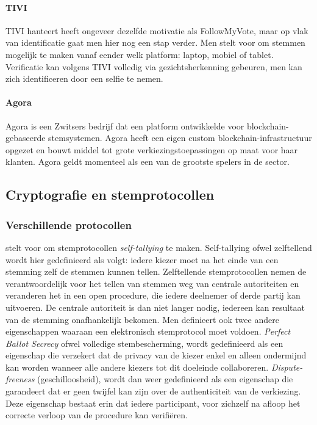				\paragraph{TIVI}
					TIVI hanteert heeft ongeveer dezelfde motivatie als FollowMyVote, maar op vlak van identificatie gaat men hier nog een stap verder. Men stelt voor om stemmen mogelijk te maken vanaf eender welk platform: laptop, mobiel of tablet. Verificatie kan volgens TIVI volledig via gezichtsherkenning gebeuren, men kan zich  identificeren door een selfie te nemen. ~\autocite{Kshetri2018}
				\paragraph{Agora}
					Agora is een Zwitsers bedrijf dat een platform ontwikkelde voor blockchain-gebaseerde stemsystemen. Agora heeft een eigen custom blockchain-infrastructuur opgezet en bouwt middel tot grote verkiezingstoepassingen op maat voor haar klanten. Agora geldt momenteel als een van de grootste spelers in de sector. ~\autocite{Kshetri2018}
					
	\subsection{Cryptografie en stemprotocollen}
		\subsubsection{Verschillende protocollen}
		\textcite{Kiayias2002} stelt voor om stemprotocollen \textit{self-tallying} te maken. Self-tallying ofwel zelftellend wordt hier gedefinieerd als volgt: iedere kiezer moet na het einde van een stemming zelf de stemmen kunnen tellen. Zelftellende stemprotocollen nemen de verantwoordelijk voor het tellen van stemmen weg van centrale autoriteiten en veranderen het in een open procedure, die iedere deelnemer of derde partij kan uitvoeren. De centrale autoriteit is dan niet langer nodig, iedereen kan resultaat van de stemming onafhankelijk bekomen. Men definieert ook twee andere eigenschappen waaraan een elektronisch stemprotocol moet voldoen.  \textit{Perfect Ballot Secrecy} ofwel volledige stembescherming, wordt gedefinieerd als een eigenschap die verzekert dat de privacy van de kiezer enkel en alleen ondermijnd kan worden wanneer alle andere kiezers tot dit doeleinde collaboreren. \textit{Dispute-freeness} (geschilloosheid), wordt dan weer gedefinieerd als een eigenschap die garandeert dat er geen twijfel kan zijn over de authenticiteit van de verkiezing. Deze eigenschap bestaat erin dat iedere participant,  voor zichzelf na afloop het correcte verloop van de procedure kan verifiëren. 	~\autocite{Kiayias2002}
			
